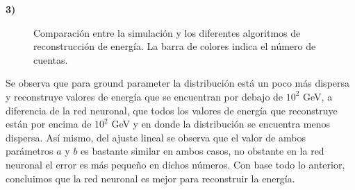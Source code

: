\documentclass[11pt]{article}
\begin{document}
\textbf{3)}
\begin{figure}[H]
\centering
{}

\caption{Comparación entre la simulación y los diferentes algoritmos de reconstrucción de energía. La barra de colores indica el número de cuentas.}
\label{fig:Prob3}
\end{figure}

Se observa que para ground parameter la distribución está un poco más dispersa y reconstruye valores de energía que se encuentran por debajo de $10^2$ GeV, a diferencia de la red neuronal, que todos los valores de energía que reconstruye están por encima de $10^2$ GeV y en donde la distribución se encuentra menos dispersa. Así mismo, del ajuste lineal se observa que el valor de ambos parámetros $a$ y $b$ es bastante similar en ambos casos, no obstante en la red neuronal el error es más pequeño en dichos números. Con base todo lo anterior, concluimos que la red neuronal es mejor para reconstruir la energía.
\end{document}
